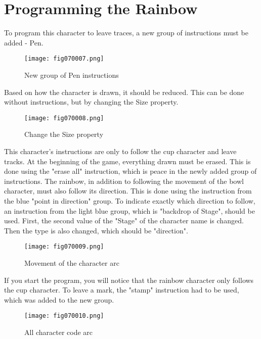 \section{Programming the Rainbow}
To program this character to leave traces, a new group of instructions must be added - Pen.

\begin{figure}[H]
   \centering
   \texttt{[image: fig070007.png]}
   \caption{New group of Pen instructions}
\label{fig070007}
\end{figure}

Based on how the character is drawn, it should be reduced. This can be done without instructions, but by changing the Size property.

\begin{figure}[H]
   \centering
   \texttt{[image: fig070008.png]}
   \caption{Change the Size property}
\label{fig070008}
\end{figure}

This character's instructions are only to follow the cup character and leave tracks. At the beginning of the game, everything drawn must be erased. This is done using the "erase all" instruction, which is peace in the newly added group of instructions. The rainbow, in addition to following the movement of the bowl character, must also follow its direction. This is done using the instruction from the blue "point in direction" group. To indicate exactly which direction to follow, an instruction from the light blue group, which is "backdrop of Stage", should be used. First, the second value of the "Stage" of the character name is changed. Then the type is also changed, which should be "direction".

\begin{figure}[H]
   \centering
   \texttt{[image: fig070009.png]}
   \caption{Movement of the character arc}
\label{fig070009}
\end{figure}

If you start the program, you will notice that the rainbow character only follows the cup character. To leave a mark, the "stamp" instruction had to be used, which was added to the new group.

\begin{figure}[H]
   \centering
   \texttt{[image: fig070010.png]}
   \caption{All character code arc}
\label{fig070010}
\end{figure}

